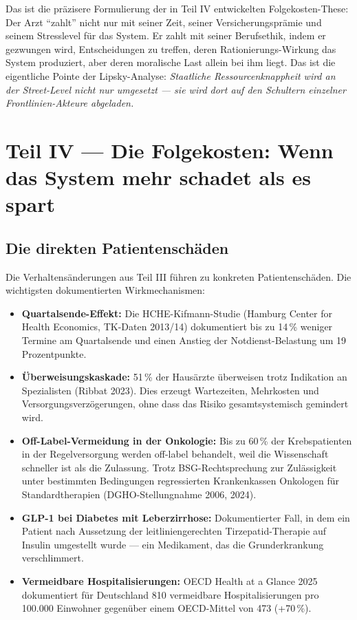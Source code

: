 \documentclass{umbruch-position}
\begin{document}
Das ist die präzisere Formulierung der in Teil IV entwickelten Folgekosten-These: Der Arzt ``zahlt'' nicht nur mit seiner Zeit, seiner Versicherungsprämie und seinem Stresslevel für das System. Er zahlt mit seiner Berufsethik, indem er gezwungen wird, Entscheidungen zu treffen, deren Rationierungs-Wirkung das System produziert, aber deren moralische Last allein bei ihm liegt. Das ist die eigentliche Pointe der Lipsky-Analyse: \textit{Staatliche Ressourcenknappheit wird an der Street-Level nicht nur umgesetzt --- sie wird dort auf den Schultern einzelner Frontlinien-Akteure abgeladen.}


\section{Teil IV --- Die Folgekosten: Wenn das System mehr schadet als es spart}

\subsection{Die direkten Patientenschäden}

Die Verhaltensänderungen aus Teil III führen zu konkreten Patientenschäden. Die wichtigsten dokumentierten Wirkmechanismen:

\begin{itemize}[nosep]
  \item \textbf{Quartalsende-Effekt:} Die HCHE-Kifmann-Studie (Hamburg Center for Health Economics, TK-Daten 2013/14) dokumentiert bis zu 14\,\% weniger Termine am Quartalsende und einen Anstieg der Notdienst-Belastung um 19 Prozentpunkte.
  \item \textbf{Überweisungskaskade:} 51\,\% der Hausärzte überweisen trotz Indikation an Spezialisten (Ribbat 2023). Dies erzeugt Wartezeiten, Mehrkosten und Versorgungsverzögerungen, ohne dass das Risiko gesamtsystemisch gemindert wird.
  \item \textbf{Off-Label-Vermeidung in der Onkologie:} Bis zu 60\,\% der Krebspatienten in der Regelversorgung werden off-label behandelt, weil die Wissenschaft schneller ist als die Zulassung. Trotz BSG-Rechtsprechung zur Zulässigkeit unter bestimmten Bedingungen regressierten Krankenkassen Onkologen für Standardtherapien (DGHO-Stellungnahme 2006, 2024).
  \item \textbf{GLP-1 bei Diabetes mit Leberzirrhose:} Dokumentierter Fall, in dem ein Patient nach Aussetzung der leitliniengerechten Tirzepatid-Therapie auf Insulin umgestellt wurde --- ein Medikament, das die Grunderkrankung verschlimmert.
  \item \textbf{Vermeidbare Hospitalisierungen:} OECD Health at a Glance 2025 dokumentiert für Deutschland 810 vermeidbare Hospitalisierungen pro 100.000 Einwohner gegenüber einem OECD-Mittel von 473 (+70\,\%).
\end{itemize}
\end{document}
